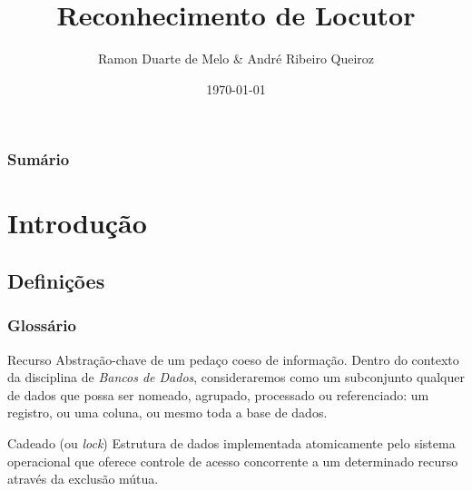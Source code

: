 \documentclass{beamer}
\title[Locutor]{Reconhecimento de Locutor} %
\author{Ramon Duarte de Melo \& André Ribeiro Queiroz} %
\institute[UFRJ] %
{
    Universidade Federal do Rio de Janeiro \\ %
    \medskip
    \textit{ramonduarte@poli.ufrj.br \& handre_queiroz@poli.ufrj.br} %
}
\date{\today} %
\begin{document}
\begin{frame} %
    \titlepage %
\end{frame}

\begin{frame} %
    \frametitle{Sumário} %
    \tableofcontents %
\end{frame}


\section{Introdução} %

\subsection{Definições} %

\begin{frame} %
    \frametitle{Glossário}
    
    \begin{block}{Recurso}
        Abstração-chave de um pedaço coeso de informação. Dentro do contexto da disciplina de \emph{Bancos de Dados}, consideraremos como um subconjunto qualquer de dados que possa ser nomeado, agrupado, processado ou referenciado: um registro, ou uma coluna, ou mesmo toda a base de dados. 
    \end{block}
    \begin{block}{Cadeado (ou \emph{lock})}
        Estrutura de dados implementada atomicamente pelo sistema operacional que oferece controle de acesso concorrente a um determinado recurso através da exclusão mútua.
    \end{block}
\end{frame}
\end{document}

